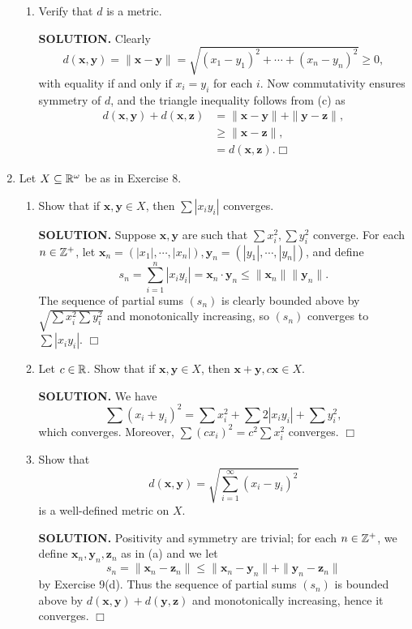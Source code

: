 \documentclass{article}
\begin{document}
\begin{enumerate}
\begin{enumerate}
        \item Verify that $d$ is a metric.

        {\bf SOLUTION.} Clearly 
        $$d(\mathbf{x}, \mathbf{y}) = \|\mathbf{x} - \mathbf{y}\| = \sqrt{(x_1-y_1)^2 + \cdots + (x_n-y_n)^2} \geq 0,$$
        with equality if and only if $x_i = y_i$ for each $i$. Now commutativity ensures symmetry of $d$, and the triangle inequality follows from (c) as
        \begin{align*}
            d(\mathbf{x}, \mathbf{y}) + d(\mathbf{x}, \mathbf{z}) &= \|\mathbf{x} - \mathbf{y}\| + \|\mathbf{y} - \mathbf{z}\|, \\
            &\geq \|\mathbf{x} - \mathbf{z}\|, \\
            &= d(\mathbf{x}, \mathbf{z}). \Box
        \end{align*}
    \end{enumerate}

    \item Let $X \subseteq \mathbb{R}^\omega$ be as in Exercise 8.
    \begin{enumerate}
        \item Show that if $\mathbf{x}, \mathbf{y} \in X$, then $\sum|x_iy_i|$ converges.

        {\bf SOLUTION.} Suppose $\mathbf{x}, \mathbf{y}$ are such that $\sum x_i^2, \sum y_i^2$ converge. For each $n \in \mathbb{Z}^+$, let $\mathbf{x}_n = (|x_1|, \cdots, |x_n|), \mathbf{y}_n = (|y_1|, \cdots, |y_n|)$, and define
        $$s_n = \sum_{i=1}^n |x_iy_i| = \mathbf{x}_n \cdot \mathbf{y}_n \leq \|\mathbf{x}_n\| \|\mathbf{y}_n\|.$$
        The sequence of partial sums $(s_n)$ is clearly bounded above by $\sqrt{\sum x_i^2 \sum y_i^2}$ and monotonically increasing, so $(s_n)$ converges to $\sum|x_iy_i|$. $\Box$
        
        \item Let $c \in \mathbb{R}$. Show that if $\mathbf{x}, \mathbf{y} \in X$, then $\mathbf{x} + \mathbf{y}, c\mathbf{x} \in X$.

        {\bf SOLUTION.} We have
        $$\sum(x_i+y_i)^2 = \sum x_i^2 + \sum 2|x_iy_i| + \sum y_i^2,$$
        which converges. Moreover, $\sum (cx_i)^2 = c^2 \sum x_i^2$ converges. $\Box$
        
        \item Show that
        $$d(\mathbf{x}, \mathbf{y}) = \sqrt{\sum_{i=1}^\infty(x_i-y_i)^2}$$
        is a well-defined metric on $X$.

        {\bf SOLUTION.} Positivity and symmetry are trivial; for each $n \in \mathbb{Z}^+$, we define $\mathbf{x}_n, \mathbf{y}_n, \mathbf{z}_n$ as in (a) and we let
        $$s_n = \|\mathbf{x}_n - \mathbf{z}_n \| \leq \|\mathbf{x}_n - \mathbf{y}_n\| + \|\mathbf{y}_n - \mathbf{z}_n\|$$
        by Exercise 9(d). Thus the sequence of partial sums $(s_n)$ is bounded above by $d(\mathbf{x}, \mathbf{y}) + d(\mathbf{y}, \mathbf{z})$ and monotonically increasing, hence it converges. $\Box$
    \end{enumerate}


\end{enumerate}
\end{document}
